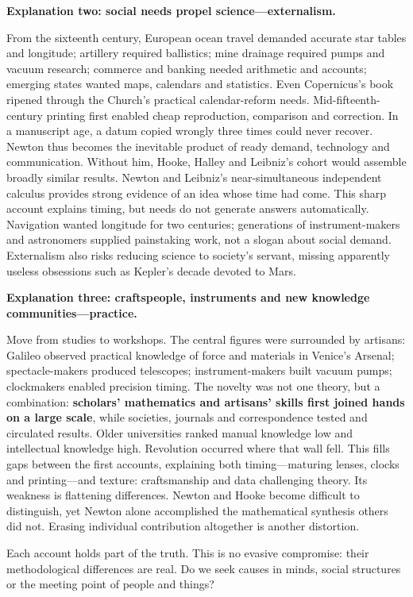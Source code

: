 \textbf{Explanation two: social needs propel science---externalism.}

From the sixteenth century, European ocean travel demanded accurate star tables and longitude; artillery required ballistics; mine drainage required pumps and vacuum research; commerce and banking needed arithmetic and accounts; emerging states wanted maps, calendars and statistics. Even Copernicus's book ripened through the Church's practical calendar-reform needs. Mid-fifteenth-century printing first enabled cheap reproduction, comparison and correction. In a manuscript age, a datum copied wrongly three times could never recover. Newton thus becomes the inevitable product of ready demand, technology and communication. Without him, Hooke, Halley and Leibniz's cohort would assemble broadly similar results. Newton and Leibniz's near-simultaneous independent calculus provides strong evidence of an idea whose time had come. This sharp account explains timing, but needs do not generate answers automatically. Navigation wanted longitude for two centuries; generations of instrument-makers and astronomers supplied painstaking work, not a slogan about social demand. Externalism also risks reducing science to society's servant, missing apparently useless obsessions such as Kepler's decade devoted to Mars.

\textbf{Explanation three: craftspeople, instruments and new knowledge communities---practice.}

Move from studies to workshops. The central figures were surrounded by artisans: Galileo observed practical knowledge of force and materials in Venice's Arsenal; spectacle-makers produced telescopes; instrument-makers built vacuum pumps; clockmakers enabled precision timing. The novelty was not one theory, but a combination: \textbf{scholars' mathematics and artisans' skills first joined hands on a large scale}, while societies, journals and correspondence tested and circulated results. Older universities ranked manual knowledge low and intellectual knowledge high. Revolution occurred where that wall fell. This fills gaps between the first accounts, explaining both timing---maturing lenses, clocks and printing---and texture: craftsmanship and data challenging theory. Its weakness is flattening differences. Newton and Hooke become difficult to distinguish, yet Newton alone accomplished the mathematical synthesis others did not. Erasing individual contribution altogether is another distortion.

Each account holds part of the truth. This is no evasive compromise: their methodological differences are real. Do we seek causes in minds, social structures or the meeting point of people and things?

